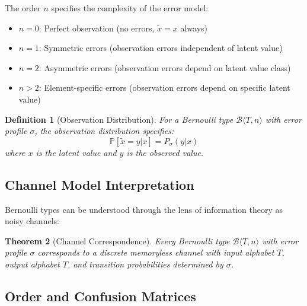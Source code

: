 \documentclass[11pt,final,hidelinks]{article}
\newtheorem{theorem}{Theorem}[section]
\newtheorem{definition}[theorem]{Definition}
\newcommand{\bernoulli}[2]{\mathcal{B}\langle #1, #2 \rangle}
\newcommand{\Prob}[1]{\mathbb{P}\left[#1\right]}
\begin{document}
The order $n$ specifies the complexity of the error model:
\begin{itemize}
    \item $n = 0$: Perfect observation (no errors, $\tilde{x} = x$ always)
    \item $n = 1$: Symmetric errors (observation errors independent of latent value)
    \item $n = 2$: Asymmetric errors (observation errors depend on latent value class)
    \item $n > 2$: Element-specific errors (observation errors depend on specific latent value)
\end{itemize}

\begin{definition}[Observation Distribution]
For a Bernoulli type $\bernoulli{T}{n}$ with error profile $\sigma$, the observation distribution specifies:
\begin{equation}
\Prob{\tilde{x} = y | x} = P_\sigma(y|x)
\end{equation}
where $x$ is the latent value and $y$ is the observed value.
\end{definition}

\subsection{Channel Model Interpretation}

Bernoulli types can be understood through the lens of information theory as noisy channels:

\begin{theorem}[Channel Correspondence]
Every Bernoulli type $\bernoulli{T}{n}$ with error profile $\sigma$ corresponds to a discrete memoryless channel with input alphabet $T$, output alphabet $T$, and transition probabilities determined by $\sigma$.
\end{theorem}

\subsection{Order and Confusion Matrices}
\end{document}
